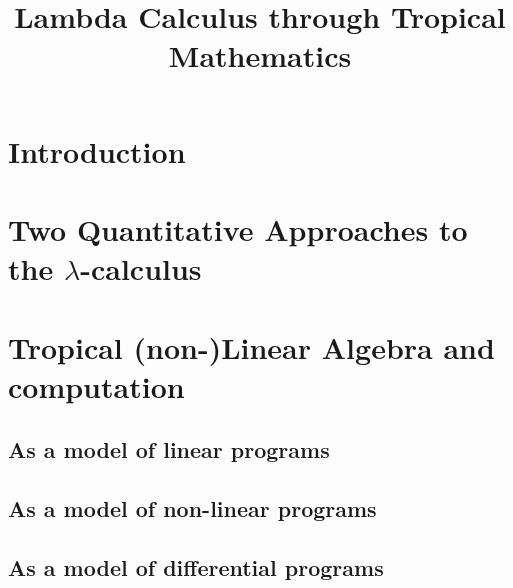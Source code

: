 \documentclass[conference]{IEEEtran}
\begin{document}
\title{Lambda Calculus through Tropical Mathematics}

\author{
\and
{}
}

\maketitle

\begin{abstract}

\end{abstract}

\begin{IEEEkeywords}
\end{IEEEkeywords}

\section{Introduction}



\section{Two Quantitative Approaches to the $\lambda$-calculus}



\section{Tropical (non-)Linear Algebra and computation}

%

\subsection{As a model of linear programs}


\subsection{As a model of non-linear programs}
%

\subsection{As a model of differential programs}
%
\end{document}
